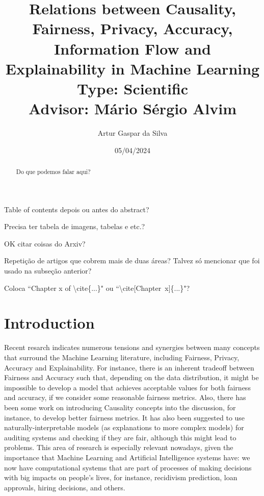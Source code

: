 \documentclass{article}
\title{Relations between Causality, Fairness, Privacy, Accuracy, Information Flow and Explainability in Machine Learning\large\\ Type: Scientific\\Advisor: Mário Sérgio Alvim}
\author{Artur Gaspar da Silva}
\date{05/04/2024}
\newcommand{\qm}[1]{``#1"}
\begin{document}
\maketitle

{\color{orange} Table of contents depois ou antes do abstract?}

{\color{orange} Precisa ter tabela de imagens, tabelas e etc.?}

{\color{orange} OK citar coisas do Arxiv?}

{\color{orange} Repetição de artigos que cobrem mais de duas áreas? Talvez só mencionar que foi usado na subseção anterior?}

{\color{orange} Coloca \qm{Chapter x of \textbackslash cite\{...\}} ou \qm{\textbackslash cite[Chapter~x]\{...\}}?}

\begin{abstract}
    Do que podemos falar aqui?
\end{abstract}

\tableofcontents

\section{Introduction}

Recent resarch\cite{Sok}\cite{Reductions}\cite{Rachel}\cite{Awareness} indicates numerous tensions and synergies between many concepts that surround the Machine Learning literature, including Fairness, Privacy, Accuracy and Explainability. For instance, there is an inherent tradeoff between Fairness and Accuracy such that, depending on the data distribution, it might be impossible to develop a model that achieves acceptable values for both fairness and accuracy, if we consider some reasonable fairness metrics\cite{Carlos}. Also, there has been some work on introducing Causality concepts into the discussion, for instance, to develop better fairness metrics\cite{CausalFair}. It has also been suggested to use naturally-interpretable models (as explanations to more complex models) for auditing systems and checking if they are fair, although this might lead to problems\cite{ExplainAll}. This area of research is especially relevant nowadays, given the importance that Machine Learning and Artificial Intelligence systems have: we now have computational systems that are part of processes of making decisions with big impacts on people's lives, for instance, recidivism prediction\cite{Compass}, loan approvals\cite{Loans}, hiring decisions\cite{Jobs}, and others.
\end{document}
